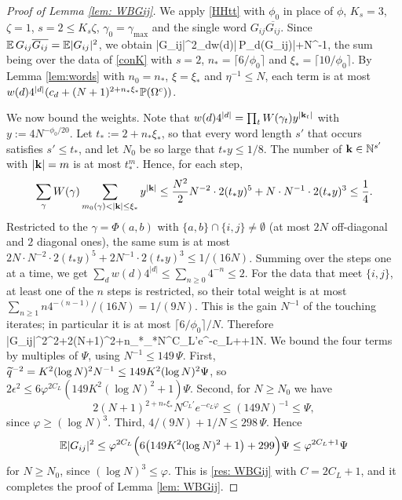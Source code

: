 \begin{proof}[Proof of Lemma \ref{lem: WBGij}]
We apply \eqref{HHtt} with $\phi_0$ in place of $\phi$, $K_s=3$, $\zeta=1$, $s=2\le K_s\zeta$, $\gamma_0=\gamma_{\max}$ and the single word $G_{ij}\overline{G_{ij}}$. Since $\mathbb{E}\,G_{ij}\overline{G_{ij}}=\mathbb{E}|G_{ij}|^2$, we obtain
\be
\E|G_{ij}|^2\le\sum_dw(d)\left|\E\,\mathcal P_d\big(\wt G_{ij}\big)\right|+N^{-1},
\ee
the sum being over the data of \eqref{conK} with $s=2$, $n_*=\lceil6/\phi_0\rceil$ and $\xi_*=\lceil10/\phi_0\rceil$. By Lemma \ref{lem:words} with $n_0=n_*$, $\xi=\xi_*$ and $\eta^{-1}\le N$, each term is at most $w(d)4^{|d|}(c_d+(N+1)^{2+n_*\xi_*}\mathbb{P}(\Omega^c))$.

We now bound the weights. Note that $w(d)4^{|d|}=\prod_tW(\gamma_t)y^{|{\bf k}_t|}$ with $y:=4N^{-\phi_0/20}$. Let $t_*:=2+n_*\xi_*$, so that every word length $s'$ that occurs satisfies $s'\le t_*$, and let $N_0$ be so large that $t_*y\le1/8$. The number of ${\bf k}\in\mathbb N^{s'}$ with $|{\bf k}|=m$ is at most $t_*^m$. Hence, for each step,
$$
\sum_{\gamma}W(\gamma)\sum_{m_0(\gamma)<|{\bf k}|\le\xi_*}y^{|{\bf k}|}\le\frac{N^2}2N^{-2}\cdot2(t_*y)^5+N\cdot N^{-1}\cdot2(t_*y)^3\le\frac14.
$$
Restricted to the $\gamma=\Phi(a,b)$ with $\{a,b\}\cap\{i,j\}\ne\emptyset$ (at most $2N$ off-diagonal and $2$ diagonal ones), the same sum is at most $2N\cdot N^{-2}\cdot2(t_*y)^5+2N^{-1}\cdot2(t_*y)^3\le1/(16N)$. Summing over the steps one at a time, we get $\sum_dw(d)4^{|d|}\le\sum_{n\ge0}4^{-n}\le2$. For the data that meet $\{i,j\}$, at least one of the $n$ steps is restricted, so their total weight is at most $\sum_{n\ge1}n4^{-(n-1)}/(16N)=1/(9N)$. This is the gain $N^{-1}$ of the touching iterates; in particular it is at most $\lceil6/\phi_0\rceil/N$. Therefore
\be\label{sysz}
\E|G_{ij}|^2\epsilon^2+2(N+1)^{2+n_*\xi_*}N^{C_L'}e^{-c_L\varphi}++\frac1N.
\ee
We bound the four terms by multiples of $\Psi$, using $N^{-1}\le149\,\Psi$. First, $\widetilde q^{-2}=K^2(\log N)^2N^{-1}\le149K^2(\log N)^2\Psi$, so $2\epsilon^2\le6\varphi^{2C_L}(149K^2(\log N)^2+1)\Psi$. Second, for $N\ge N_0$ we have
$$
2(N+1)^{2+n_*\xi_*}N^{C_L'}e^{-c_L\varphi}\le(149N)^{-1}\le\Psi,
$$
since $\varphi\ge(\log N)^3$. Third, $4/(9N)+1/N\le298\,\Psi$. Hence
$$
\mathbb{E}|G_{ij}|^2\le\varphi^{2C_L}\Big(6\big(149K^2(\log N)^2+1\big)+299\Big)\Psi\le\varphi^{2C_L+1}\Psi
$$
for $N\ge N_0$, since $(\log N)^3\le\varphi$. This is \eqref{res: WBGij} with $C=2C_L+1$, and it completes the proof of Lemma \ref{lem: WBGij}.
\end{proof}

